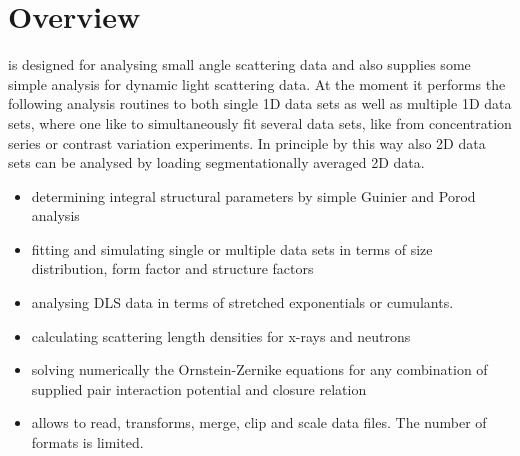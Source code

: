 \section{Overview}

\SASfit is designed for analysing small angle scattering data and also supplies some simple analysis for dynamic light scattering data. At the moment it performs the following analysis routines to both single 1D data sets as well as multiple 1D data sets, where one like to simultaneously fit several data sets, like from concentration series or contrast variation experiments. In principle by this way also 2D data sets can be analysed by loading segmentationally averaged 2D data.
\begin{itemize}
\item determining integral structural parameters by simple Guinier and Porod analysis
\item fitting and simulating single or multiple data sets in terms of size distribution, form factor and structure factors
\item analysing DLS data in terms of stretched exponentials or cumulants.
\item calculating scattering length densities for x-rays and neutrons
\item solving numerically the Ornstein-Zernike equations for any combination of supplied pair interaction potential and closure relation
\item allows to read, transforms, merge, clip and scale data files. The number of formats is limited.
\end{itemize}
